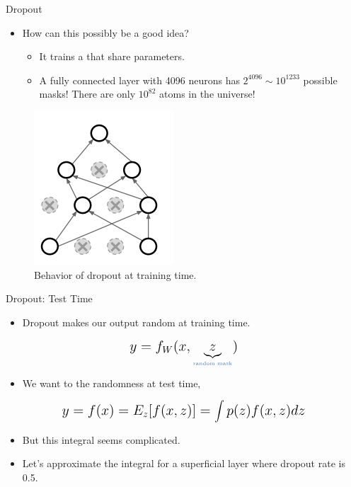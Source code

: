 \begin{frame}{Dropout}
	\begin{itemize}
		\item How can this possibly be a good idea?
		\medskip
		\begin{itemize}
			\item It trains a  that share parameters.
			\medskip
			\item A fully connected layer with 4096 neurons has $2^{4096} \sim 10^{1233}$ possible masks! There are only $10^{82}$ atoms in the universe!
		\end{itemize}
	\end{itemize}
	\begin{figure}[H]
		\centering
		\includegraphics[height=0.4\textheight]{Figs/section_4/dropout_why2.png}
		\caption{Behavior of dropout at training time. \cite{cs231n-2018-lecture7}}
	\end{figure}
\end{frame}
\begin{frame}{Dropout: Test Time}
	\begin{itemize}
		\item Dropout makes our output random at training time.
		\medskip
	\end{itemize}
	\begin{equation*}
		\mathlarger{\mathlarger{
		y = f_W(x, \underbrace{z}_{\text{\tiny{\tc{keywords}{random mask}}}})
	}}
	\end{equation*}
	\begin{itemize}
		\item We want to  the randomness at test time,
		\medskip
	\end{itemize}
	\begin{equation*}
		\mathlarger{\mathlarger{
			y = f(x) = E_z[f(x, z)] = \int p(z)f(x, z) dz
		}}
	\end{equation*}
	\begin{itemize}
		\item But this integral seems complicated.
		\medskip
		\item Let's approximate the integral for a superficial layer where dropout rate is 0.5.
	\end{itemize}
\end{frame}
